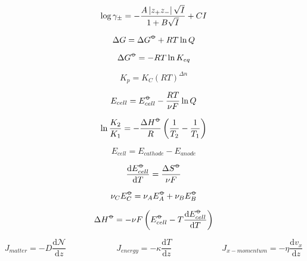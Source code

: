 \documentclass[12pt, letterpaper]{memoir}
\begin{document}
\noindent
\begin{minipage}[t]{0.5\linewidth}
	
	\begin{equation*}
		\log\gamma_\pm = -\frac{A\left| z_+z_- \right|\sqrt{I}}{1+B\sqrt{I}} + CI
	\end{equation*}
	
	\begin{equation*}
		\Delta G = \Delta G^{\std} +RT\ln Q
	\end{equation*}
	
	\begin{equation*}
		\Delta G^{\std}=-RT\ln K_{eq}
	\end{equation*}
	
	\begin{equation*}
		K_p=K_C\left(RT\right)^{\Delta n}
	\end{equation*}
	
	\begin{equation*}
		E_{cell}=E^{\std}_{cell}-\frac{RT}{\nu F}\ln Q
	\end{equation*}	
\end{minipage}
\begin{minipage}[t]{0.5\linewidth}
	\begin{equation*}
		\ln\frac{K_2}{K_1} = -\frac{\Delta H^{\std}}{R}\left(\frac{1}{T_2}-\frac{1}{T_1}\right)
	\end{equation*}
	
	\begin{equation*}
		E_{cell}=E_{cathode}-E_{anode}
	\end{equation*}
	
	\begin{equation*}
		\frac{\mathrm{d}E^{\std}_{cell}}{\mathrm{d}T}=\frac{\Delta S^{\std}}{\nu F}
	\end{equation*}
	
	\begin{equation*}
		\nu_CE^{\std}_C = \nu_AE^{\std}_A + \nu_BE^{\std}_B
	\end{equation*}

	\begin{equation*}
		\Delta H^{\std}=-\nu F\left(E^{\std}_{cell}-T\frac{\mathrm{d}E^{\std}_{cell}}{\mathrm{d}T}\right)
	\end{equation*}	
\end{minipage}

\begin{equation*}
	J_{matter}=-D\frac{\mathrm{d}\mathcal{N}}{\mathrm{d}z} \hspace{6em} J_{energy}=-\kappa\frac{\mathrm{d}T}{\mathrm{d}z} \hspace{6em} J_{x-momentum}=-\eta\frac{\mathrm{d}v_x}{\mathrm{d}z}
\end{equation*}
\end{document}
